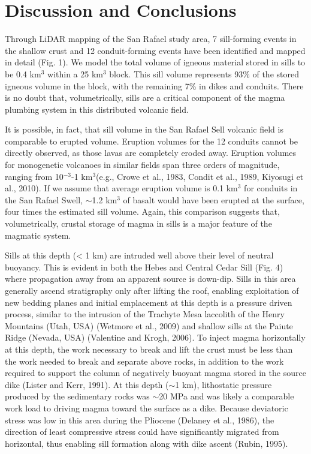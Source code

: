 \documentclass[12pt,letter]{article}
\begin{document}
\section{Discussion and Conclusions}

Through LiDAR mapping of the San Rafael study area, 7 sill-forming events in the shallow crust and 12 conduit-forming events have been identified and mapped in detail (Fig. 1). We model the total volume of igneous material stored in sills to be 0.4 km$^3$ within a 25 km$^3$ block. This sill volume represents 93\% of the stored igneous volume in the block, with the remaining 7\% in dikes and conduits. There is no doubt that, volumetrically, sills are a critical component of the magma plumbing system in this distributed volcanic field.

It is possible, in fact, that sill volume in the San Rafael Sell volcanic field is comparable to erupted volume. Eruption volumes for the 12 conduits cannot be directly observed, as those lavas are completely eroded away. Eruption volumes for monogenetic volcanoes in similar fields span three orders of magnitude, ranging from 10$^{-3}$-1 km$^3$(e.g., Crowe et al., 1983, Condit et al., 1989, Kiyosugi et al., 2010). If we assume that average eruption volume is 0.1 km$^3$ for conduits in the San Rafael Swell, $\sim$1.2 km$^3$ of basalt would have been erupted at the surface, four times the estimated sill volume. Again, this comparison suggests that, volumetrically, crustal storage of magma in sills is a major feature of the magmatic system.

Sills at this depth (< 1 km) are intruded well above their level of neutral buoyancy. This is evident in both the Hebes and Central Cedar Sill (Fig. 4) where propagation away from an apparent source is down-dip. Sills in this area generally ascend stratigraphy only after lifting the roof, enabling exploitation of new bedding planes and initial emplacement at this depth is a pressure driven process, similar to the intrusion of the Trachyte Mesa laccolith of the Henry Mountains (Utah, USA) (Wetmore et al., 2009) and shallow sills at the Paiute Ridge (Nevada, USA) (Valentine and Krogh, 2006). To inject magma horizontally at this depth, the work necessary to break and lift the crust must be less than the work needed to break and separate above rocks, in addition to the work required to support the column of negatively buoyant magma stored in the source dike (Lister and Kerr, 1991). At this depth ($\sim$1 km), lithostatic pressure produced by the sedimentary rocks was $\sim$20 MPa and was likely a comparable work load to driving magma toward the surface as a dike. Because deviatoric stress was low in this area during the Pliocene (Delaney et al., 1986), the direction of least compressive stress could have significantly migrated from horizontal, thus enabling sill formation along with dike ascent (Rubin, 1995).
\end{document}
